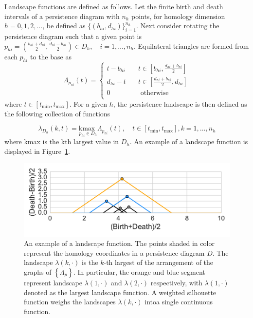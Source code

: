\documentclass[12pt]{article}
\begin{document}
Landscape functions are defined as follows.  Let the finite birth and death intervals of a persistence diagram with $n_h$ points, for homology dimension $h = 0, 1, 2, \ldots$, be defined as $\{(b_{hi},d_{hi})\}_{i = 1}^{n_h}$.  Next consider rotating the persistence diagram such that a given point is $p_{hi} = \left(\frac{b_{hi}+d_{hi}}{2}, \frac{d_{hi}-b_{hi}}{2}\right) \in D_h, \quad i = 1, \ldots, n_h$.  Equilateral triangles are formed from each $p_{hi}$ to the base as
\begin{equation*}
\Lambda_{p_{hi}}(t) =
  \begin{cases}
    t - b_{hi}  & \quad t \in [b_{hi}, \frac{d_{hi}+b_{hi}}{2}]\\
    d_{hi} - t  & \quad t \in [\frac{d_{hi}+b_{hi}}{2}, d_{hi}]\\
    0  & \quad \text{ otherwise}\\
  \end{cases}
\end{equation*}
where $t \in [t_{\min}, t_{\max}]$. For a given $h$, the persistence landscape is then defined as the following collection of functions

\begin{equation*}
\lambda_{D_h}(k, t) = \underset{p_{hi}\in D_h}{\text{kmax }} \Lambda_{p_{hi}}(t), \quad t \in [t_{\min}, t_{\max}], k = 1, \ldots, n_h
\end{equation*}
where kmax is the kth largest value in $D_h$.  An example of a landscape function is displayed in Figure~\ref{fig:landscape}.

\begin{center}
\begin{figure}[htp!]
  \centering
  \includegraphics[width=0.6\linewidth]{figure_3_silh.pdf}
    \caption{An example of a landscape function. The points shaded in color represent the homology coordinates in a persistence diagram $D$. The landscape $\lambda(k, \cdot)$ is the $k$-th largest of the arrangement of the graphs of $\left \{ \Lambda_{p} \right \}$. In particular, the orange and blue segment represent landscape $\lambda(1, \cdot)$ and $\lambda(2, \cdot)$ respectively, with $\lambda(1, \cdot)$ denoted as the largest landscape function. A weighted silhouette function weighs the landscapes $\lambda(k, \cdot)$ intoa  single continuous function.}
    \label{fig:landscape}
\end{figure}
\end{center}
\end{document}
